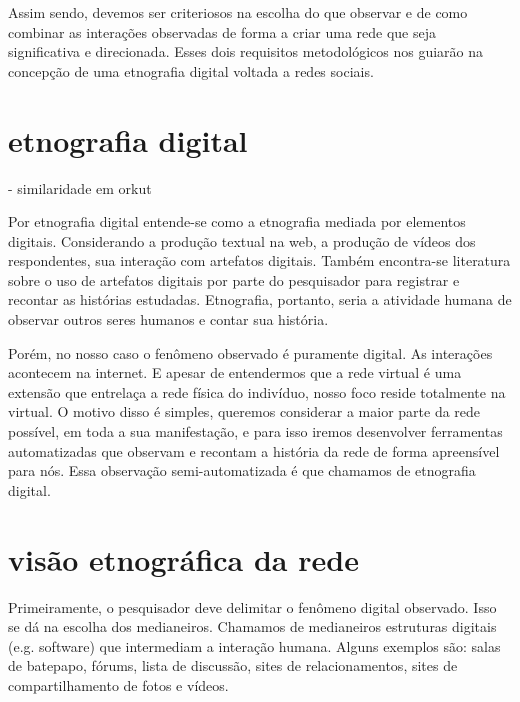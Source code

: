 \documentclass{article}
\begin{document}
Assim sendo, devemos ser criteriosos na escolha do que observar e de como
combinar as interações observadas de forma a criar uma rede que seja
significativa e direcionada. Esses dois requisitos metodológicos nos guiarão na
concepção de uma etnografia digital voltada a redes sociais.

\section{etnografia digital}

\cite{Spertus2005} - similaridade em orkut


Por etnografia digital entende-se como a etnografia mediada por elementos
digitais. Considerando a produção textual na web, a produção de vídeos dos
respondentes, sua interação com artefatos digitais. Também encontra-se
literatura sobre o uso de artefatos digitais por parte do pesquisador para
registrar e recontar as histórias estudadas. Etnografia, portanto, seria a
atividade humana de observar outros seres humanos e contar sua história. 

Porém, no nosso caso o fenômeno observado é puramente digital. As interações
acontecem na internet. E apesar de entendermos que a rede virtual é uma extensão
que entrelaça a rede física do indivíduo, nosso foco reside totalmente na
virtual. O motivo disso é simples, queremos considerar a maior parte da rede
possível, em toda a sua manifestação, e para isso iremos desenvolver ferramentas
automatizadas que observam e recontam a história da rede de forma apreensível
para nós. Essa observação semi-automatizada é que chamamos de etnografia
digital.

\section{visão etnográfica da rede}

Primeiramente, o pesquisador deve delimitar o fenômeno digital observado. Isso
se dá na escolha dos medianeiros. Chamamos de medianeiros estruturas digitais
(e.g. software) que intermediam a interação humana. Alguns exemplos são: salas
de batepapo, fórums, lista de discussão, sites de relacionamentos, sites de
compartilhamento de fotos e vídeos.
\end{document}
